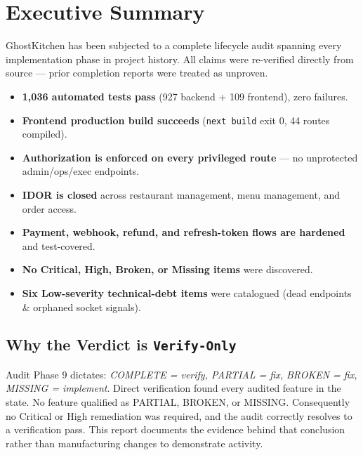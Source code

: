 \documentclass[11pt,a4paper]{article}
\newcommand{\bcomplete}{\badge[ok]{COMPLETE}}
\begin{document}
\tableofcontents
\newpage

\section{Executive Summary}

\begin{tcolorbox}[colback=ok!6,colframe=ok,title=\textbf{Headline Findings},
  fonttitle=\bfseries,breakable]
GhostKitchen has been subjected to a complete lifecycle audit spanning every
implementation phase in project history.  All claims were re-verified directly
from source — prior completion reports were treated as unproven.

\begin{itemize}[leftmargin=1.4em,nosep]
  \item \textbf{1{,}036 automated tests pass} (927 backend + 109 frontend), zero failures.
  \item \textbf{Frontend production build succeeds} (\texttt{next build} exit 0, 44 routes compiled).
  \item \textbf{Authorization is enforced on every privileged route} — no unprotected admin/ops/exec endpoints.
  \item \textbf{IDOR is closed} across restaurant management, menu management, and order access.
  \item \textbf{Payment, webhook, refund, and refresh-token flows are hardened} and test-covered.
  \item \textbf{No Critical, High, Broken, or Missing items} were discovered.
  \item \textbf{Six Low-severity technical-debt items} were catalogued (dead endpoints \& orphaned socket signals).
\end{itemize}
\end{tcolorbox}

\subsection{Why the Verdict is \texttt{Verify-Only}}

Audit Phase 9 dictates: \emph{COMPLETE = verify, PARTIAL = fix, BROKEN = fix,
MISSING = implement}.  Direct verification found every audited feature in the
\bcomplete{} state.  No feature qualified as PARTIAL, BROKEN, or MISSING.
Consequently no Critical or High remediation was required, and the audit
correctly resolves to a verification pass.  This report documents the evidence
behind that conclusion rather than manufacturing changes to demonstrate activity.
\end{document}
